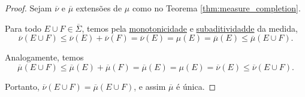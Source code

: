 \begin{proof}
    Sejam $\overline{\nu}$ e $\overline{\mu}$ extensões de $\mu$ como no Teorema \ref{thm:measure_completion}. 

    Para todo $E\cup F\in \overline{\Sigma}$, temos pela \hyperref[prop:measure_is_monotonic]{monotonicidade} e \hyperref[prop:measure_is_subadditive]{subaditividadde} da medida,
    \begin{equation*}
        \overline{\nu}(E\cup F) \leq \overline{\nu}(E) + \overline{\nu}(F) = \overline{\nu}(E) = \mu(E) = \overline{\mu}(E)\leq \overline{\mu}(E\cup F).
    \end{equation*}

    Analogamente, temos 
    \begin{equation*}
        \overline{\mu}(E\cup F) \leq \overline{\mu}(E) + \overline{\mu}(F) = \overline{\mu}(E) = \mu(E) = \overline{\nu}(E) \leq \overline{\nu}(E\cup F).
    \end{equation*}

    Portanto, $\overline{\nu}(E\cup F) = \overline{\mu}(E\cup F)$, e assim $\overline{\mu}$ é única.
\end{proof}